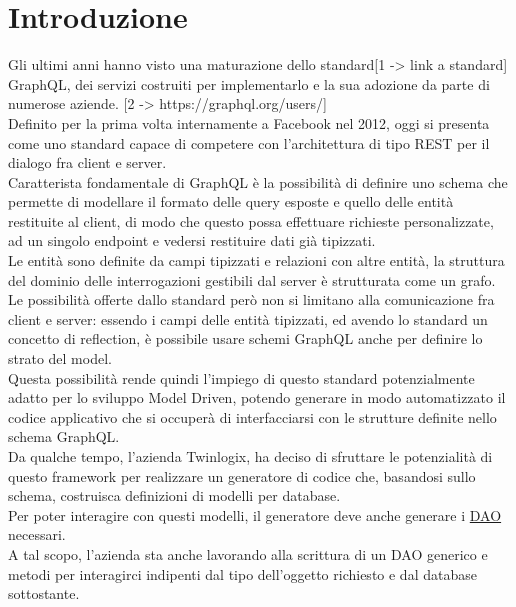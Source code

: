 \documentclass[a4paper, 12pt]{scrartcl}
\begin{document}
    
    
  \section*{Introduzione}
    Gli ultimi anni hanno visto una maturazione dello standard[1 -> link a standard] GraphQL, dei servizi costruiti per implementarlo e la sua adozione da parte di numerose aziende. [2 -> https://graphql.org/users/] \\
    Definito per la prima volta internamente a Facebook nel 2012, oggi si presenta come uno standard capace di competere con l'architettura di tipo REST per il dialogo fra client e server. \\
    Caratterista fondamentale di GraphQL è la possibilità di definire uno schema che permette di modellare il formato delle query esposte e quello delle entità restituite al client, di modo che questo possa effettuare richieste personalizzate, ad un singolo endpoint e vedersi restituire dati già tipizzati. \\
    Le entità sono definite da campi tipizzati e relazioni con altre entità, la struttura del dominio delle interrogazioni gestibili dal server è strutturata come un grafo. \\

    Le possibilità offerte dallo standard però non si limitano alla comunicazione fra client e server: essendo i campi delle entità tipizzati, ed avendo lo standard un concetto di reflection, è possibile usare 
    schemi GraphQL anche per definire lo strato del model. \\
    Questa possibilità rende quindi l'impiego di questo standard potenzialmente adatto per lo sviluppo Model Driven, potendo generare in modo automatizzato il codice applicativo che si occuperà di interfacciarsi con le strutture definite nello schema GraphQL. \\

    Da qualche tempo, l'azienda Twinlogix, ha deciso di sfruttare le potenzialità di questo framework per realizzare un generatore di codice che, basandosi sullo schema, costruisca definizioni di modelli per database. \\
    Per poter interagire con questi modelli, il generatore deve anche generare i \href{https://en.wikipedia.org/wiki/Data_access_object}{DAO} necessari.\\
    A tal scopo, l'azienda sta anche lavorando alla scrittura di un DAO generico e metodi per interagirci indipenti dal tipo dell'oggetto richiesto e dal database sottostante.
\end{document}
